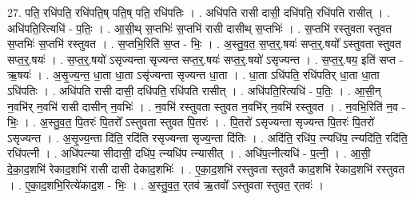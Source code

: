 \documentclass[17pt]{extarticle}
\begin{document}
27. पति॒ रधि॑पति॒ रधि॑पति॒ष् पति॒ष् पति॒ रधि॑पतिः । . अधि॑पति रासी दासी॒ दधि॑पति॒ रधि॑पति रासीत् । . अधि॑पति॒रित्यधि॑ - प॒तिः॒ । . आ॒सी॒थ् स॒प्तभिः॑ स॒प्तभि॑ रासी दासीथ् स॒प्तभिः॑ । . स॒प्तभि॑ रस्तुवता स्तुवत स॒प्तभिः॑ स॒प्तभि॑ रस्तुवत । . स॒प्तभि॒रिति॑ स॒प्त - भिः॒ । . अ॒स्तु॒व॒त॒ स॒प्त॒र्॒.षयः॑ सप्त॒र्॒.षयो᳚ ऽस्तुवता स्तुवत सप्त॒र्॒.षयः॑ । . स॒प्त॒र्॒.षयो॑ ऽसृज्यन्ता सृज्यन्त सप्त॒र्॒.षयः॑ सप्त॒र्॒.षयो॑ ऽसृज्यन्त । . स॒प्त॒र्॒.षय॒ इति॑ सप्त - ऋ॒षयः॑ । . अ॒सृ॒ज्य॒न्त॒ धा॒ता धा॒ता ऽसृ॑ज्यन्ता सृज्यन्त धा॒ता । . धा॒ता ऽधि॑पति॒ रधि॑पतिर् धा॒ता धा॒ता ऽधि॑पतिः । . अधि॑पति रासी दासी॒ दधि॑पति॒ रधि॑पति रासीत् । . अधि॑पति॒रित्यधि॑ - प॒तिः॒ । . आ॒सी॒न् न॒वभि॑र् न॒वभि॑ रासी दासीन् न॒वभिः॑ । . न॒वभि॑ रस्तुवता स्तुवत न॒वभि॑र् न॒वभि॑ रस्तुवत । . न॒वभि॒रिति॑ न॒व - भिः॒ । . अ॒स्तु॒व॒त॒ पि॒तरः॑ पि॒तरो᳚ ऽस्तुवता स्तुवत पि॒तरः॑ । . पि॒तरो॑ ऽसृज्यन्ता सृज्यन्त पि॒तरः॑ पि॒तरो॑ ऽसृज्यन्त । . अ॒सृ॒ज्य॒न्ता दि॑ति॒ रदि॑ति रसृज्यन्ता सृज्य॒न्ता दि॑तिः । . अदि॑ति॒ रधि॑प॒ त्न्यधि॑प॒ त्न्यदि॑ति॒ रदि॑ति॒ रधि॑पत्नी । . अधि॑पत्न्या सीदासी॒ दधि॑प॒ त्न्यधि॑प त्न्यासीत् । . अधि॑प॒त्नीत्यधि॑ - प॒त्नी॒ । . आ॒सी॒ दे॒का॒द॒शभि॑ रेकाद॒शभि॑ रासी दासी देकाद॒शभिः॑ । . ए॒का॒द॒शभि॑ रस्तुवता स्तुवतै काद॒शभि॑ रेकाद॒शभि॑ रस्तुवत । . ए॒का॒द॒शभि॒रित्ये॑काद॒श - भिः॒ । . अ॒स्तु॒व॒त॒ र्‌तव॑ ऋ॒तवो᳚ ऽस्तुवता स्तुवत॒ र्‌तवः॑ । \newline
\end{document}
